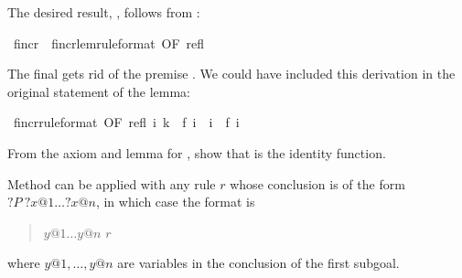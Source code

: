 \begin{isabellebody}
\begin{isamarkuptext}
The desired result, , follows from :%
\end{isamarkuptext}%
\isamarkuptrue%
\isamarkupfalse%
\ f{}incr\ {}\ f{}incr{}lem{}rule{}format{}\ OF\ refl{}%
\begin{isamarkuptext}%
\noindent
The final  gets rid of the premise . 
We could have included this derivation in the original statement of the lemma:%
\end{isamarkuptext}%
\isamarkuptrue%
\isamarkupfalse%
\ f{}incr{}rule{}format{}\ OF\ refl{}{}\ {}{}i{}\ k\ {}\ f\ i\ {}\ i\ {}\ f\ i{}%
\isadelimproof
%
\endisadelimproof
%
\isatagproof
%
\endisatagproof
{\isafoldproof}%
%
\isadelimproof
%
\endisadelimproof
%
\begin{isamarkuptext}%
\begin{exercise}
From the axiom and lemma for , show that  is the
identity function.
\end{exercise}

Method  can be applied with any rule $r$
whose conclusion is of the form ${?}P~?x@1 \dots ?x@n$, in which case the
format is
\begin{quote}
 $y@1 \dots y@n$  $r$
\end{quote}
where $y@1, \dots, y@n$ are variables in the conclusion of the first subgoal.


\end{isamarkuptext}
\end{isabellebody}
